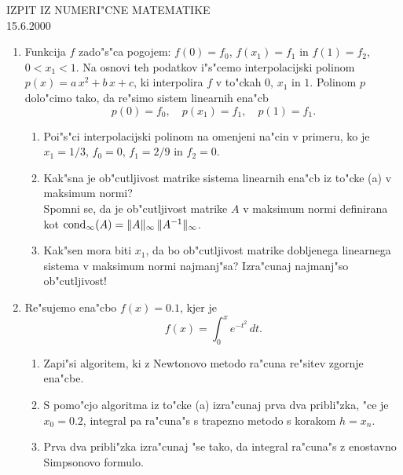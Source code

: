 \documentclass[12pt,a4paper]{article}
\begin{document}
  \begin{center}
    {\Large IZPIT IZ NUMERI"CNE MATEMATIKE}\\
    15.6.2000
  \end{center}
\begin{enumerate}

  \item Funkcija $f$ zado"s"ca pogojem: $f(0)=f_0$, $f(x_1)=f_1$
  in $f(1)=f_2$, $0< x_1<1$. Na osnovi teh podatkov 
  i"s"cemo interpolacijski
  polinom $p(x)=a\,x^2+b\,x+c$, ki interpolira
  $f$ v to"ckah $0$, $x_1$ in $1$. Polinom $p$ dolo"cimo
  tako, da re"simo sistem linearnih ena"cb
  $$p(0)=f_0,\quad p(x_1)=f_1,\quad p(1)=f_1.$$

  \begin{enumerate}
   
     \item Poi"s"ci interpolacijski polinom na omenjeni na"cin
     v primeru, ko je $x_1=1/3$, $f_0=0$, $f_1=2/9$ in
     $f_2=0$.

     \item Kak"sna je ob"cutljivost matrike sistema linearnih
     ena"cb iz to"cke (a) v maksimum normi?\\
     Spomni se, da je ob"cutljivost matrike $A$ v maksimum normi
     definirana kot ${\rm cond}_\infty(A)=\|A\|_\infty\,
     \|A^{-1}\|_\infty$.

     \item  Kak"sen mora biti $x_1$, da bo ob"cutljivost matrike
     dobljenega linearnega sistema v maksimum normi najmanj"sa?
     Izra"cunaj najmanj"so ob"cutljivost!
  \end{enumerate}

  \item Re"sujemo ena"cbo $f(x)=0.1$, kjer je 
        $$f(x)=\int_{0}^{x}e^{-t^2}\,dt.$$
        
        \begin{enumerate}
         
           
          \item Zapi"si algoritem, ki z Newtonovo metodo ra"cuna re"sitev
                zgornje ena"cbe.
          \item S pomo"cjo algoritma iz to"cke (a) izra"cunaj prva dva 
                pribli"zka, "ce je $x_0=0.2$, integral pa ra"cuna"s s
                trapezno metodo s korakom $h=x_n$.
          
          \item Prva dva pribli"zka izra"cunaj "se tako, da integral 
                ra"cuna"s z enostavno Simpsonovo formulo.
        \end{enumerate}  

\end{enumerate}
\end{document}

